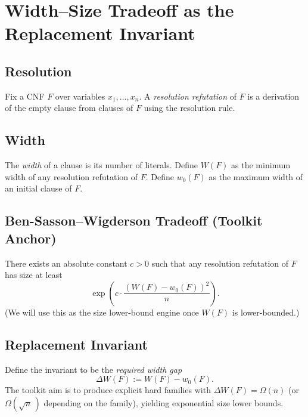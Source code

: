 \section{Width--Size Tradeoff as the Replacement Invariant}

\subsection{Resolution}
Fix a CNF $F$ over variables $x_1,\dots,x_n$.
A \emph{resolution refutation} of $F$ is a derivation of the empty clause
from clauses of $F$ using the resolution rule.

\subsection{Width}
The \emph{width} of a clause is its number of literals.
Define $W(F)$ as the minimum width of any resolution refutation of $F$.
Define $w_0(F)$ as the maximum width of an initial clause of $F$.

\subsection{Ben-Sasson--Wigderson Tradeoff (Toolkit Anchor)}
There exists an absolute constant $c>0$ such that any resolution refutation
of $F$ has size at least
\[
\exp\!\left( c \cdot \frac{(W(F)-w_0(F))^2}{n} \right).
\]
(We will use this as the size lower-bound engine once $W(F)$ is lower-bounded.)

\subsection{Replacement Invariant}
Define the invariant to be the \emph{required width gap}
\[
\Delta W(F) := W(F)-w_0(F).
\]
The toolkit aim is to produce explicit hard families with $\Delta W(F)=\Omega(n)$
(or $\Omega(\sqrt{n}\,)$ depending on the family), yielding exponential size lower bounds.
